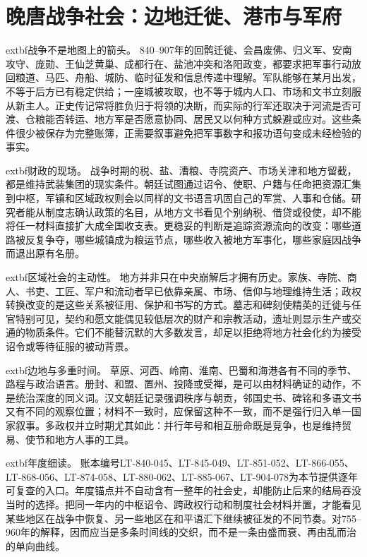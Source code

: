 \section{晚唐战争社会：边地迁徙、港市与军府}
\label{sec:late-tang-regional-war-society}

\noindent	extbf{战争不是地图上的箭头。} 840--907年的回鹘迁徙、会昌废佛、归义军、安南攻守、庞勋、王仙芝黄巢、成都行在、盐池冲突和洛阳政变，都要求把军事行动放回粮道、马匹、舟船、城防、临时征发和信息传递中理解。军队能够在某月出发，不等于后方已有稳定供给；一座城被攻取，也不等于城内人口、市场和文书立刻服从新主人。正史传记常将胜负归于将领的决断，而实际的行军还取决于河流是否可渡、仓粮能否转运、地方军是否愿意协同、居民又以何种方式躲避或应对。这些条件很少被保存为完整账簿，正需要叙事避免把军事数字和报功语句变成未经检验的事实。

\noindent	extbf{财政的现场。} 战争时期的税、盐、漕粮、寺院资产、市场关津和地方留截，都是维持武装集团的现实条件。朝廷试图通过诏令、使职、户籍与任命把资源汇集到中枢，军镇和区域政权则会以同样的文书语言巩固自己的军赏、人事和仓储。研究者能从制度志确认政策的名目，从地方文书看见个别纳税、借贷或役使，却不能将任一材料直接扩大成全国收支表。更稳妥的判断是追踪资源流向的改变：哪些道路被反复争夺，哪些城镇成为粮运节点，哪些收入被地方军事化，哪些家庭因战争而退出原有名册。

\noindent	extbf{区域社会的主动性。} 地方并非只在中央崩解后才拥有历史。家族、寺院、商人、书吏、工匠、军户和流动者早已依靠亲属、市场、信仰与地理维持生活；政权转换改变的是这些关系被征用、保护和书写的方式。墓志和碑刻使精英的迁徙与任官特别可见，契约和愿文能偶见较低层次的财产和宗教活动，遗址则显示生产或交通的物质条件。它们不能替沉默的大多数发言，却足以拒绝将地方社会化约为接受诏令或等待征服的被动背景。

\noindent	extbf{边地与多重时间。} 草原、河西、岭南、淮南、巴蜀和海港各有不同的季节、路程与政治语言。册封、和盟、置州、投降或受禅，是可以由材料确证的动作，不是统治深度的同义词。汉文朝廷记录强调秩序与朝贡，邻国史书、碑铭和多语文书又有不同的观察位置；材料不一致时，应保留这种不一致，而不是强行归入单一国家叙事。多政权并立时期尤其如此：并行年号和相互册命既是竞争，也是维持贸易、使节和地方人事的工具。

\noindent	extbf{年度细读。} 账本编号LT-840-045、LT-845-049、LT-851-052、LT-866-055、LT-868-056、LT-874-058、LT-880-062、LT-885-067、LT-904-078为本节提供逐年可复查的入口。年度锚点并不自动含有一整年的社会史，却能防止后来的结局吞没当时的选择。把同一年内的中枢诏令、跨政权行动和制度社会材料并置，才能看见某些地区在战争中恢复、另一些地区在和平语汇下继续被征发的不同节奏。对755--960年的解释，因而应当是多条时间线的交织，而不是一条由盛而衰、再由乱而治的单向曲线。

